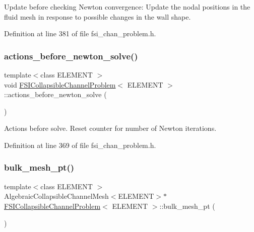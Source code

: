 Update before checking Newton convergence\+: Update the nodal positions in the fluid mesh in response to possible changes in the wall shape. 



Definition at line 381 of file fsi\+\_\+chan\+\_\+problem.\+h.

\mbox{\label{classFSICollapsibleChannelProblem_ad10b2d12be052c6b1bc5005dc27cd229}} 
\subsubsection{\texorpdfstring{actions\+\_\+before\+\_\+newton\+\_\+solve()}{actions\_before\_newton\_solve()}}
{\footnotesize\ttfamily template$<$class E\+L\+E\+M\+E\+NT $>$ \\
void \hyperlink{classFSICollapsibleChannelProblem}{F\+S\+I\+Collapsible\+Channel\+Problem}$<$ E\+L\+E\+M\+E\+NT $>$\+::actions\+\_\+before\+\_\+newton\+\_\+solve (\begin{DoxyParamCaption}{ }\end{DoxyParamCaption})\hspace{0.3cm}{\ttfamily [inline]}}



Actions before solve. Reset counter for number of Newton iterations. 



Definition at line 369 of file fsi\+\_\+chan\+\_\+problem.\+h.

\mbox{\label{classFSICollapsibleChannelProblem_a9b461f3afef3185ea0b461714675ef8f}} 
\subsubsection{\texorpdfstring{bulk\+\_\+mesh\+\_\+pt()}{bulk\_mesh\_pt()}}
{\footnotesize\ttfamily template$<$class E\+L\+E\+M\+E\+NT $>$ \\
Algebraic\+Collapsible\+Channel\+Mesh$<$E\+L\+E\+M\+E\+NT$>$$\ast$ \hyperlink{classFSICollapsibleChannelProblem}{F\+S\+I\+Collapsible\+Channel\+Problem}$<$ E\+L\+E\+M\+E\+NT $>$\+::bulk\+\_\+mesh\+\_\+pt (\begin{DoxyParamCaption}{ }\end{DoxyParamCaption})\hspace{0.3cm}{\ttfamily [inline]}}



